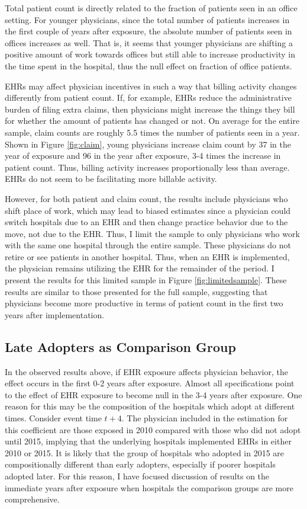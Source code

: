 \documentclass[11pt]{article}
\begin{document}
Total patient count is directly related to the fraction of patients seen in an office setting. For younger physicians, since the total number of patients increases in the first couple of years after exposure, the absolute number of patients seen in offices increases as well. That is, it seems that younger physicians are shifting a positive amount of work towards offices but still able to increase productivity in the time spent in the hospital, thus the null effect on fraction of office patients. 

EHRs may affect physician incentives in such a way that billing activity changes differently from patient count. If, for example, EHRs reduce the administrative burden of filing extra claims, then physicians might increase the things they bill for whether the amount of patients has changed or not. On average for the entire sample, claim counts are roughly 5.5 times the number of patients seen in a year. Shown in Figure \ref{fig:claim}, young physicians increase claim count by 37 in the year of exposure and 96 in the year after exposure, 3-4 times the increase in patient count. Thus, billing activity increases proportionally less than average. EHRs do not seem to be facilitating more billable activity. 

However, for both patient and claim count, the results include physicians who shift place of work, which may lead to biased estimates since a physician could switch hospitals due to an EHR and then change practice behavior due to the move, not due to the EHR. Thus, I limit the sample to only physicians who work with the same one hospital through the entire sample. These physicians do not retire or see patients in another hospital. Thus, when an EHR is implemented, the physician remains utilizing the EHR for the remainder of the period. I present the results for this limited sample in Figure \ref{fig:limitedsample}. These results are similar to those presented for the full sample, suggesting that physicians become more productive in terms of patient count in the first two years after implementation.


\subsection{Late Adopters as Comparison Group}

In the observed results above, if EHR exposure affects physician behavior, the effect occurs in the first 0-2 years after exposure. Almost all specifications point to the effect of EHR exposure to become null in the 3-4 years after exposure. One reason for this may be the composition of the hospitals which adopt at different times. Consider event time $t+4$. The physician included in the estimation for this coefficient are those exposed in 2010 compared with those who did not adopt until 2015, implying that the underlying hospitals implemented EHRs in either 2010 or 2015. It is likely that the group of hospitals who adopted in 2015 are compositionally different than early adopters, especially if poorer hospitals adopted later. For this reason, I have focused discussion of results on the immediate years after exposure when hospitals the comparison groups are more comprehensive. 
\end{document}
